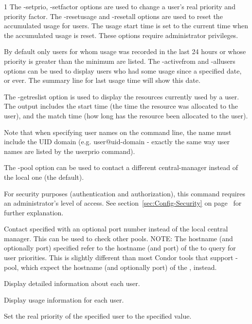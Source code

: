 \begin{ManPage}{\label{man-condor-userprio}}{1}
The -setprio, -setfactor options are used to change a user's real priority and priority factor.
The -resetusage and -resetall options are used to reset the accumulated usage for users. The
usage start time is set to the current time when the accumulated usage is reset. These
options require administrator privileges.

By default only users for whom usage was recorded in the last 24 hours or whose priority is
greater than the minimum are listed. The -activefrom and -allusers options can be used
to display users who had some usage since a specified date, or ever. The summary line for 
last usage time will show this date.

The -getreslist option is used to display the resources currently used by a user. The
output includes the start time (the time the resource was allocated to the user), and
the match time (how long has the resource been allocated to the user).

Note that when specifying user names on the command line, the name must include the
UID domain (e.g. user@uid-domain - exactly the same way user names are listed by the
userprio command).

The -pool option can be used to contact a different central-manager instead of
the local one (the default).

For security purposes (authentication and authorization),
this command requires an administrator's level of access.
See
section~\ref{sec:Config-Security} on page~\pageref{sec:Config-Security}
for further explanation.

\begin{Options}

	{Contact specified  with an
	optional port number instead of the local central
	manager. This can be used to check other pools.  NOTE: The
	hostname (and optionally port) specified refer to the hostname
	(and port) of the  to query for user
	priorities.  This is slightly different than most Condor tools
	that support -pool, which expect the hostname (and optionally
	port) of the , instead.}

	{Display detailed information about each user.}

	{Display usage information for each user.}

	{Set the real priority of the specified user to the specified value.}


\end{Options}
\end{ManPage}
